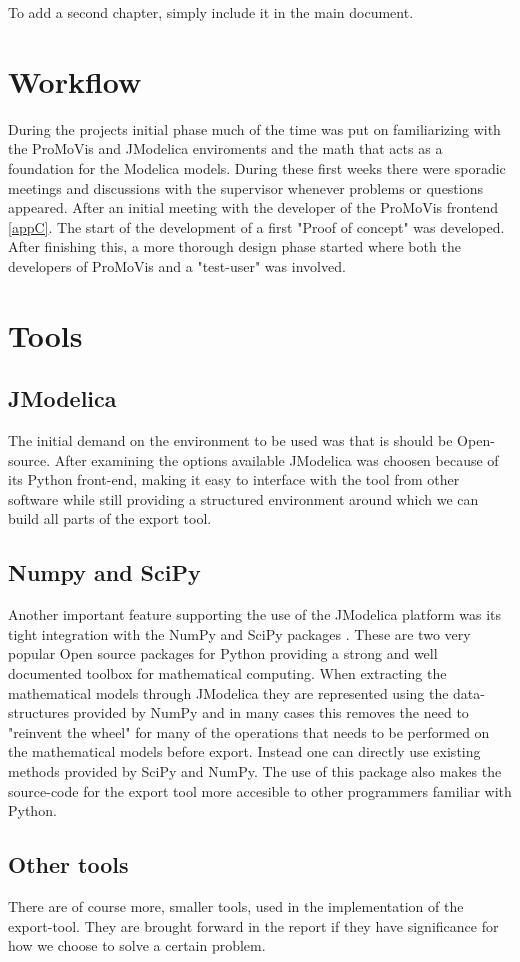 To add a second chapter, simply include it in the main document.

\section{Workflow}
During the projects initial phase much of the time was put on familiarizing with the ProMoVis and JModelica enviroments and the math that acts as a foundation for the Modelica models. During these first weeks there were sporadic meetings and discussions with the supervisor whenever problems or questions appeared. After an initial meeting with the developer of the ProMoVis frontend \ref{appC}. The start of the development of a first "Proof of concept" was developed. After finishing this, a more thorough design phase started where both the developers of ProMoVis and a "test-user" was involved. 
\section{Tools}
\subsection{JModelica}
The initial demand on the environment to be used was that is should be Open-source. After examining the options available JModelica\cite{jmodelicaorg}\nocite{*} was choosen because of its Python front-end, making it easy to interface with the tool from other software while still providing a structured environment around which we can build all parts of the export tool.   
\subsection{Numpy and SciPy}
Another important feature supporting the use of the JModelica platform was its tight integration with the NumPy and SciPy packages \cite{scipyorg}\nocite{*}. These are two very popular Open source packages for Python providing a strong and well documented toolbox for mathematical computing. When extracting the mathematical models through JModelica they are represented using the data-structures provided by NumPy and in many cases this removes the need to "reinvent the wheel" for many of the operations that needs to be performed on the mathematical models before export. Instead one can directly use existing methods provided by SciPy and NumPy. The use of this package also makes the source-code for the export tool more accesible to other programmers familiar with Python.
\subsection{Other tools}
There are of course more, smaller tools, used in the implementation of the export-tool. They are brought forward in the report if they have significance for how we choose to solve a certain problem.